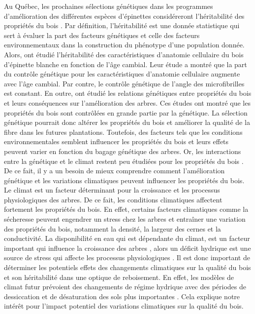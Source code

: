 \documentclass[a4paper,12pt]{report}
\begin{document}
Au Québec, les prochaines sélections génétiques dans les programmes d'amélioration des différentes espèces d'épinettes considéreront l'héritabilité des propriétés du bois \citep{Mullin2011, Beaulieu2009}. Par définition, l'héritabilité est une donnée statistique qui sert à évaluer la part des facteurs génétiques et celle des facteurs environnementaux dans la construction du phénotype d'une population donnée. Alors, \cite{Lenz2010} ont étudié l'héritabilité des caractéristiques d'anatomie cellulaire du bois d'épinette blanche en fonction de l'âge cambial. Leur étude a montré que la part du contrôle génétique pour les caractéristiques d'anatomie cellulaire augmente avec l'âge cambial. Par contre, le contrôle génétique de l'angle des microfibrilles est constant. En outre, \cite{Lenz2011} ont étudié les relations génétiques entre propriétés du bois et leurs conséquences sur l'amélioration des arbres. Ces études ont montré que les propriétés du bois sont contrôlées en grande partie par la génétique. La sélection génétique pourrait donc altérer les propriétés du bois et améliorer la qualité de la fibre dans les futures plantations. Toutefois, des facteurs tels que les conditions environnementales semblent influencer les propriétés du bois et leurs effets peuvent varier en fonction du bagage génétique des arbres. Or, les interactions entre la génétique et le climat restent peu étudiées pour les propriétés du bois \citep{Housset2018}. De ce fait, il y a un besoin de mieux comprendre comment l'amélioration génétique et les variations climatiques peuvent influencer les propriétés du bois. \\

Le climat est un facteur déterminant pour la croissance et les processus physiologiques des arbres. De ce fait, les conditions climatiques affectent fortement les propriétés du bois. En effet, certains facteurs climatiques comme la sécheresse peuvent engendrer un stress chez les arbres et entraîner une variation des propriétés du bois, notamment la densité, la largeur des cernes et la conductivité. La disponibilité en eau qui est dépendante du climat, est un facteur important qui influence la croissance des arbres \citep{Lebourgeois2005}, alors un déficit hydrique est une source de stress qui affecte les processus physiologiques \citep{Waring1987}. Il est donc important de déterminer les potentiels effets des changements climatiques sur la qualité du bois et son héritabilité dans une optique de reboisement. En effet, les modèles de climat futur prévoient des changements de régime hydrique avec des périodes de dessiccation et de désaturation des sols plus importantes \citep{IPCC_2015}. Cela explique notre intérêt pour l'impact potentiel des variations climatiques sur la qualité du bois. \\
\end{document}
